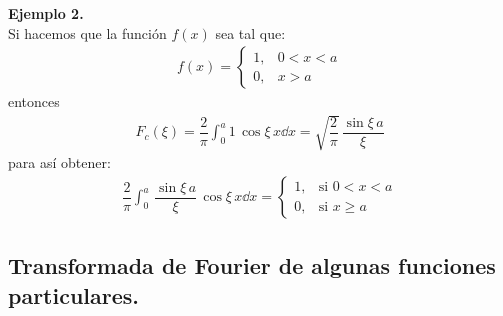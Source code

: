 \noindent
\textbf{Ejemplo 2.}
\\
Si hacemos que la función $f(x)$ sea tal que:
\begin{align*}
f(x) = \begin{cases}
1, & 0 < x < a \\[0.5em]
0, & x > a
\end{cases}
\end{align*}
entonces
\begin{align*}
F_{c}(\xi) = \dfrac{2}{\pi} \int_{0}^{a} 1 \, \cos \xi \, x \dd{x} = \sqrt{\dfrac{2}{\pi}} \, \dfrac{\sin \xi \, a}{\xi}
\end{align*}
para así obtener:
\begin{align*}
\dfrac{2}{\pi} \int_{0}^{a} \, \dfrac{\sin \xi \, a}{\xi} \, \cos \xi \, x \dd{x} = \begin{cases}
1, & \mbox{si } 0 < x < a \\[0.5em]
0, & \mbox{si } x \geq a
\end{cases}
\end{align*}

\subsection{Transformada de Fourier de algunas funciones particulares.}

